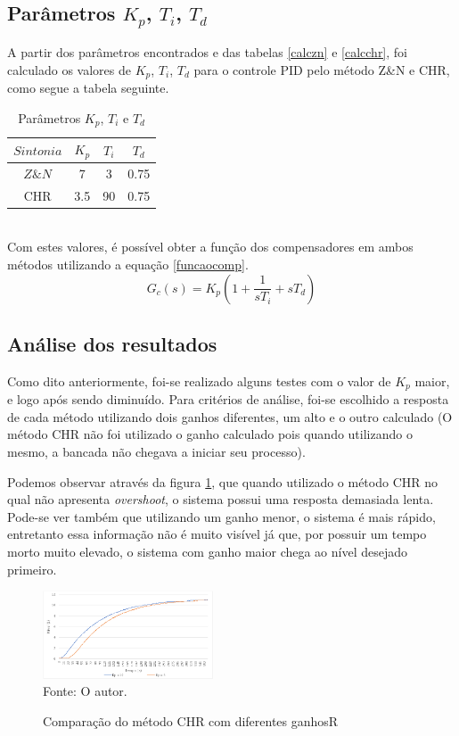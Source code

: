 \documentclass[conference]{IEEEtran}
\begin{document}
\subsection{Parâmetros \(K_p\), \(T_i\), \(T_d\)}

A partir dos parâmetros encontrados e das tabelas \ref{calczn} e \ref{calcchr}, foi calculado os valores de $K_p$, $T_i$, $T_d$ para o controle PID pelo método Z\&N e CHR, como segue a tabela seguinte.
\begin{table}[!h]
    \centering
    \caption{Parâmetros \(K_p\), \(T_i\) e \(T_d\) }
    \begin{tabular}{|c|c|c|c|} \hline
        $Sintonia$ & $K_p$ & $T_i$ & $T_d$  \\ \hline
        $Z\&N$     & 7   & 3   & 0.75 \\ \hline
        CHR      & 3.5 & 90  & 0.75 \\ \hline\end{tabular}
\end{table}\\
Com estes valores, é possível obter a função dos compensadores em ambos métodos utilizando a equação \ref{funcaocomp}.
\begin{equation}
    G_c(s) = K_p(1+ \frac{1}{sT_i}+sT_d)
    \label{funcaocomp}
\end{equation}

\subsection{Análise dos resultados}

Como dito anteriormente, foi-se realizado alguns testes com o valor de $K_p$ maior, e logo após sendo diminuído. Para critérios de análise, foi-se escolhido a resposta de cada método utilizando dois ganhos diferentes, um alto e o outro calculado (O método CHR não foi utilizado o ganho calculado pois quando utilizando o mesmo, a bancada não chegava a iniciar seu processo).

Podemos observar através da figura \ref{CHR}, que quando utilizado o método CHR no qual não apresenta \textit{overshoot}, o sistema possui uma resposta demasiada lenta. Pode-se ver também que utilizando um ganho menor, o sistema é mais rápido, entretanto essa informação não é muito visível já que, por possuir um tempo morto muito elevado, o sistema com ganho maior chega ao nível desejado primeiro.

\begin{figure}[!http]
    \centering
    \caption{Comparação do método CHR com diferentes ganhosR}
    \includegraphics[width=0.45\textwidth]{imagens/grafico_CHR.png}\\
    Fonte: O autor.
    \label{CHR}
\end{figure}
\end{document}
